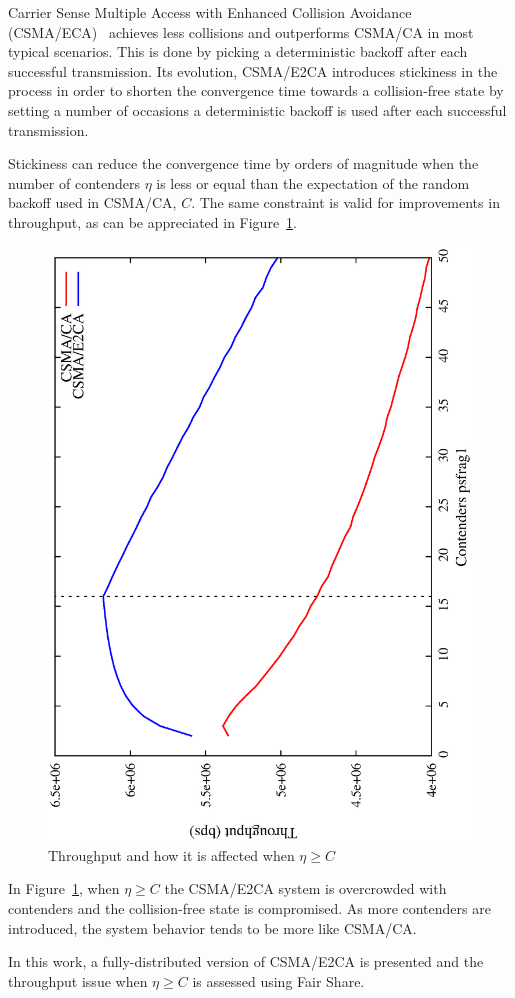 Carrier Sense Multiple Access with Enhanced Collision Avoidance (CSMA/ECA)~\cite{CSMA_ECA} achieves less collisions and outperforms CSMA/CA in most typical scenarios. This is done by picking a deterministic backoff after each successful transmission. Its evolution, CSMA/E2CA introduces stickiness in the process in order to shorten the convergence time towards a collision-free state by setting a number of occasions a deterministic backoff is used after each successful transmission.

Stickiness can reduce the convergence time by orders of magnitude when the number of contenders $\eta$ is less or equal than the expectation of the random backoff used in CSMA/CA, $C$. The same constraint is valid for improvements in throughput, as can be appreciated in Figure~\ref{fig:throughput}.

\begin{figure}[htbp]
  \centering
  \includegraphics[width=0.7\linewidth, angle = -90]{figures/throughput/throughput.eps}
  \caption{Throughput and how it is affected when $\eta \geq C$
  \label{fig:throughput}}
\end{figure}

In Figure~\ref{fig:throughput}, when $\eta \geq C$ the CSMA/E2CA system is overcrowded with contenders and the collision-free state is compromised. As more contenders are introduced, the system behavior tends to be more like CSMA/CA.

In this work, a fully-distributed version of CSMA/E2CA is presented and the throughput issue when $\eta \geq C$ is assessed using Fair Share.